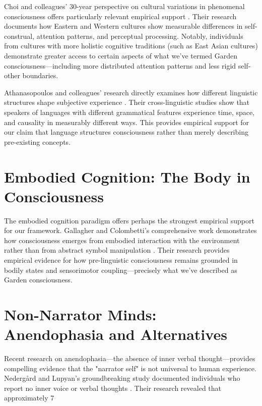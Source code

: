 Choi and colleagues' 30-year perspective on cultural variations in phenomenal consciousness offers particularly relevant empirical support \parencite{choi2023cultural}. Their research documents how Eastern and Western cultures show measurable differences in self-construal, attention patterns, and perceptual processing. Notably, individuals from cultures with more holistic cognitive traditions (such as East Asian cultures) demonstrate greater access to certain aspects of what we've termed Garden consciousness—including more distributed attention patterns and less rigid self-other boundaries.

Athanasopoulos and colleagues' research directly examines how different linguistic structures shape subjective experience \parencite{athanasopoulos2025linguistic}. Their cross-linguistic studies show that speakers of languages with different grammatical features experience time, space, and causality in measurably different ways. This provides empirical support for our claim that language structures consciousness rather than merely describing pre-existing concepts.

\section{Embodied Cognition: The Body in Consciousness}

The embodied cognition paradigm offers perhaps the strongest empirical support for our framework. Gallagher and Colombetti's comprehensive work demonstrates how consciousness emerges from embodied interaction with the environment rather than from abstract symbol manipulation \parencite{gallagher2024enactive}. Their research provides empirical evidence for how pre-linguistic consciousness remains grounded in bodily states and sensorimotor coupling—precisely what we've described as Garden consciousness.

\section{Non-Narrator Minds: Anendophasia and Alternatives}

Recent research on anendophasia—the absence of inner verbal thought—provides compelling evidence that the "narrator self" is not universal to human experience. Nedergård and Lupyan's groundbreaking study documented individuals who report no inner voice or verbal thoughts \parencite{nedergaard2021inner}. Their research revealed that approximately 7%

